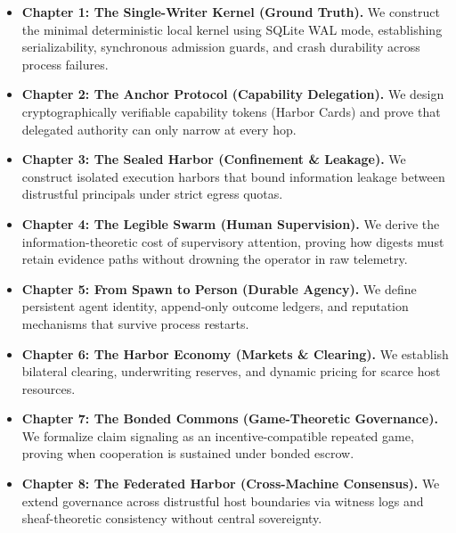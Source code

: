 \documentclass[11pt,a4paper]{article}
\begin{document}
\begin{itemize}[leftmargin=1.8em,itemsep=1.5pt,topsep=1.5pt,parsep=0pt]
  \item \textbf{Chapter 1: The Single-Writer Kernel (Ground Truth).} We construct the minimal deterministic local kernel using SQLite WAL mode, establishing serializability, synchronous admission guards, and crash durability across process failures.
  \item \textbf{Chapter 2: The Anchor Protocol (Capability Delegation).} We design cryptographically verifiable capability tokens (Harbor Cards) and prove that delegated authority can only narrow at every hop.
  \item \textbf{Chapter 3: The Sealed Harbor (Confinement \& Leakage).} We construct isolated execution harbors that bound information leakage between distrustful principals under strict egress quotas.
  \item \textbf{Chapter 4: The Legible Swarm (Human Supervision).} We derive the information-theoretic cost of supervisory attention, proving how digests must retain evidence paths without drowning the operator in raw telemetry.
  \item \textbf{Chapter 5: From Spawn to Person (Durable Agency).} We define persistent agent identity, append-only outcome ledgers, and reputation mechanisms that survive process restarts.
  \item \textbf{Chapter 6: The Harbor Economy (Markets \& Clearing).} We establish bilateral clearing, underwriting reserves, and dynamic pricing for scarce host resources.
  \item \textbf{Chapter 7: The Bonded Commons (Game-Theoretic Governance).} We formalize claim signaling as an incentive-compatible repeated game, proving when cooperation is sustained under bonded escrow.
  \item \textbf{Chapter 8: The Federated Harbor (Cross-Machine Consensus).} We extend governance across distrustful host boundaries via witness logs and sheaf-theoretic consistency without central sovereignty.
\end{itemize}
\end{document}
